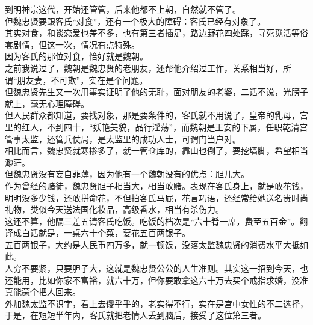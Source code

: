 \begin{multicols}{\theparacolNo}
到明神宗这代，开始还管管，后来他都不上朝，自然就不管了。\\

但魏忠贤要跟客氏“对食”，还有一个极大的障碍：客氏已经有对象了。\\

其实对食，和谈恋爱也差不多，也有第三者插足，路边野花四处踩，寻死觅活等俗套剧情，但这一次，情况有点特殊。\\

因为客氏的那位对食，恰好就是魏朝。\\

之前我说过了，魏朝是魏忠贤的老朋友，还帮他介绍过工作，关系相当好，所谓“朋友妻，不可欺”，实在是个问题。\\

但魏忠贤先生又一次用事实证明了他的无耻，面对朋友的老婆，二话不说，光膀子就上，毫无心理障碍。\\

但人民群众都知道，要找对象，那是要条件的，客氏就不用说了，皇帝的乳母，宫里的红人，不到四十，“妖艳美貌，品行淫荡”，而魏朝是王安的下属，任职乾清宫管事太监，还管兵仗局，是太监里的成功人士，可谓门当户对。\\

相比而言，魏忠贤就寒掺多了，就一管仓库的，靠山也倒了，要挖墙脚，希望相当渺茫。\\

但魏忠贤没有妄自菲薄，因为他有一个魏朝没有的优点：胆儿大。\\

作为曾经的赌徒，魏忠贤胆子相当大，相当敢赌。表现在客氏身上，就是敢花钱，明明没多少钱，还敢拼命花，不但拍客氏马屁，花言巧语，还经常给她送名贵时尚礼物，类似今天送法国化妆品，高级香水，相当有杀伤力。\\

这还不算，他隔三差五请客氏吃饭。吃饭的档次是“六十肴一席，费至五百金”。翻译成白话就是，一桌六十个菜，要花五百两银子。\\

五百两银子，大约是人民币四万多，就一顿饭，没落太监魏忠贤的消费水平大抵如此。\\

人穷不要紧，只要胆子大，这就是魏忠贤公公的人生准则。其实这一招到今天，也还能用，比如你家不富裕，就六十万，但你要敢拿这六十万去买个戒指求婚，没准真能蒙个把人回来。\\

外加魏太监不识字，看上去傻乎乎的，老实得不行，实在是宫中女性的不二选择，于是，在短短半年内，客氏就把老情人丢到脑后，接受了这位第三者。\\


\end{multicols}
